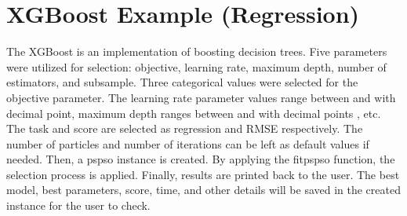 \documentclass[letterpaper,10pt,english]{sphinxmanual}
\begin{document}
\section{XGBoost Example (Regression)}
\label{\detokenize{index:xgboost-example-regression}}
The XGBoost is an implementation of boosting decision trees.
Five parameters were utilized for selection: objective, learning rate, maximum depth, number of estimators, and subsample.
Three categorical values were selected for the objective parameter.
The learning rate parameter values range between  and  with  decimal point,
maximum depth ranges between  and  with  decimal points , etc.
The task and score are selected as regression and RMSE respectively.
The number of particles and number of iterations can be left as default values if needed.
Then, a pspso instance is created. By applying the fitpspso function, the selection process is applied.
Finally, results are printed back to the user.
The best model, best parameters, score, time, and other details will be saved in the created instance for the user to check.
\end{document}
